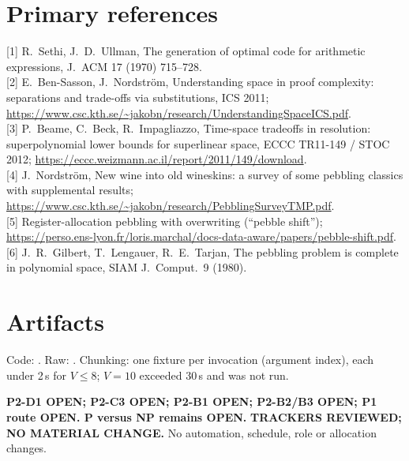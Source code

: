 \documentclass[11pt]{article}
\begin{document}
\section*{Primary references}
[1] R.~Sethi, J.~D.~Ullman, The generation of optimal code for arithmetic expressions, J.~ACM 17 (1970) 715--728.\\
{}[2] E.~Ben-Sasson, J.~Nordstr\"om, Understanding space in proof complexity: separations and trade-offs via substitutions, ICS 2011; \url{https://www.csc.kth.se/~jakobn/research/UnderstandingSpaceICS.pdf}.\\
{}[3] P.~Beame, C.~Beck, R.~Impagliazzo, Time-space tradeoffs in resolution: superpolynomial lower bounds for superlinear space, ECCC TR11-149 / STOC 2012; \url{https://eccc.weizmann.ac.il/report/2011/149/download}.\\
{}[4] J.~Nordstr\"om, New wine into old wineskins: a survey of some pebbling classics with supplemental results; \url{https://www.csc.kth.se/~jakobn/research/PebblingSurveyTMP.pdf}.\\
{}[5] Register-allocation pebbling with overwriting (``pebble shift''); \url{https://perso.ens-lyon.fr/loris.marchal/docs-data-aware/papers/pebble-shift.pdf}.\\
{}[6] J.~R.~Gilbert, T.~Lengauer, R.~E.~Tarjan, The pebbling problem is complete in polynomial space, SIAM J.~Comput.~9 (1980).

\section*{Artifacts}
Code: . Raw: . Chunking: one fixture per invocation (argument index), each under 2\,s for $V\le8$; $V=10$ exceeded 30\,s and was not run.

\noindent\textbf{P2-D1 OPEN; P2-C3 OPEN; P2-B1 OPEN; P2-B2/B3 OPEN; P1 route OPEN. P versus NP remains OPEN.} \textbf{TRACKERS REVIEWED; NO MATERIAL CHANGE.} No automation, schedule, role or allocation changes.
\end{document}
